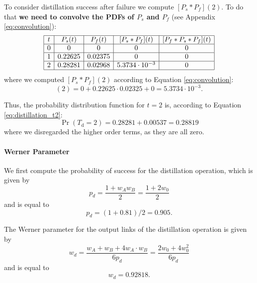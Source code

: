 \documentclass{masterthesis}
\begin{document}
To consider distillation success after failure we compute $[P_s \ast P_f](2)$. To do that \textbf{we need to convolve the PDFs of $P_s$ and $P_f$} (see Appendix \ref{eq:convolution}):
\begin{equation*}
    \begin{array}{|c|c|c|c|c|}
        \hline
        t & P_s(t) & P_f(t) & [P_s \ast P_f](t) & [P_f \ast P_s \ast P_f](t) \\
        \hline
        0 & 0 & 0 & 0 & 0 \\
        \hline
        1 & 0.22625 & 0.02375 & 0 & 0 \\
        \hline
        2 & 0.28281 & 0.02968 & 5.3734 \cdot 10^{-3} & 0 \\
        \hline
    \end{array}
\end{equation*}
where we computed $[P_s \ast P_f](2)$ according to Equation \ref{eq:convolution}:
\begin{equation}
    [P_s * P_f](2) = 0 + 0.22625 \cdot 0.02325 + 0 = 5.3734 \cdot 10^{-3} .
\end{equation}

Thus, the probability distribution function for $t = 2$ is, according to Equation \ref{eq:distillation_t2}:
\begin{equation}
    \Pr(T_{\text{d}} = 2) = 0.28281 + 0.00537 = 0.28819
\end{equation}
where we disregarded the higher order terms, as they are all zero.

\paragraph*{Werner Parameter}

We first compute the probability of success for the distillation operation, which is given by
\begin{equation}
    p_d = \frac{1 + w_A w_B}{2} = \frac{1+2w_0}{2}
\end{equation}
and is equal to
\begin{equation}
    p_d = (1 + 0.81) / 2 = 0.905 .
\end{equation}

The Werner parameter for the output links of the distillation operation is given by
\begin{equation}
    w_d = \frac{w_A + w_B + 4 w_A \cdot w_B}{6 p_d} = \frac{2w_0 + 4w_0^2}{6 p_d}
\end{equation}
and is equal to
\begin{equation}
    w_d = 0.92818 .
\end{equation}
\end{document}
